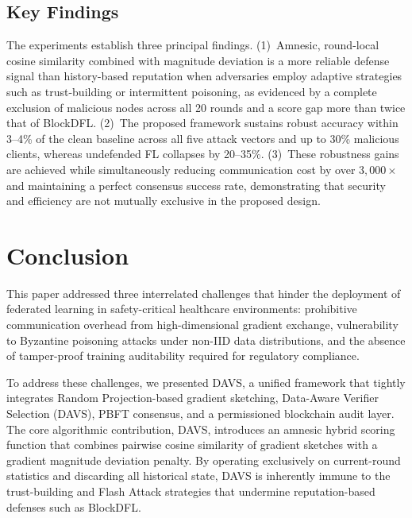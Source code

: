 \documentclass[conference]{IEEEtran}
\begin{document}
\subsection{Key Findings}
The experiments establish three principal findings. (1)~Amnesic, round-local cosine similarity combined with magnitude deviation is a more reliable defense signal than history-based reputation when adversaries employ adaptive strategies such as trust-building or intermittent poisoning, as evidenced by a complete exclusion of malicious nodes across all 20 rounds and a score gap more than twice that of BlockDFL. (2)~The proposed framework sustains robust accuracy within 3--4\% of the clean baseline across all five attack vectors and up to 30\% malicious clients, whereas undefended FL collapses by 20--35\%. (3)~These robustness gains are achieved while simultaneously reducing communication cost by over $3{,}000\times$ and maintaining a perfect consensus success rate, demonstrating that security and efficiency are not mutually exclusive in the proposed design.

\section{Conclusion}
This paper addressed three interrelated challenges that hinder the deployment of federated learning in safety-critical healthcare environments: prohibitive communication overhead from high-dimensional gradient exchange, vulnerability to Byzantine poisoning attacks under non-IID data distributions, and the absence of tamper-proof training auditability required for regulatory compliance.

To address these challenges, we presented DAVS, a unified framework that tightly integrates Random Projection-based gradient sketching, Data-Aware Verifier Selection (DAVS), PBFT consensus, and a permissioned blockchain audit layer. The core algorithmic contribution, DAVS, introduces an amnesic hybrid scoring function that combines pairwise cosine similarity of gradient sketches with a gradient magnitude deviation penalty. By operating exclusively on current-round statistics and discarding all historical state, DAVS is inherently immune to the trust-building and Flash Attack strategies that undermine reputation-based defenses such as BlockDFL.
\end{document}
